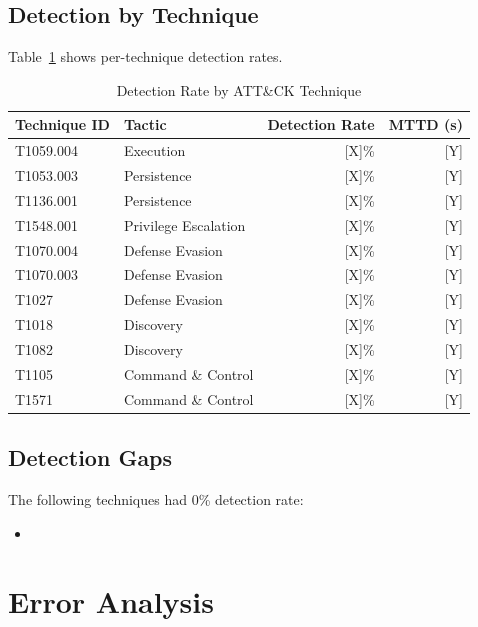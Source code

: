 \documentclass[11pt,a4paper]{article}
\begin{document}
\subsection{Detection by Technique}

Table~\ref{tab:results} shows per-technique detection rates.

\begin{table}[H]
    \centering
    \caption{Detection Rate by ATT\&CK Technique}
    \label{tab:results}
    \begin{tabular}{llrr}
        \toprule
        \textbf{Technique ID} & \textbf{Tactic} & \textbf{Detection Rate} & \textbf{MTTD (s)} \\
        \midrule
        T1059.004 & Execution & [X]\% & [Y] \\
        T1053.003 & Persistence & [X]\% & [Y] \\
        T1136.001 & Persistence & [X]\% & [Y] \\
        T1548.001 & Privilege Escalation & [X]\% & [Y] \\
        T1070.004 & Defense Evasion & [X]\% & [Y] \\
        T1070.003 & Defense Evasion & [X]\% & [Y] \\
        T1027 & Defense Evasion & [X]\% & [Y] \\
        T1018 & Discovery & [X]\% & [Y] \\
        T1082 & Discovery & [X]\% & [Y] \\
        T1105 & Command \& Control & [X]\% & [Y] \\
        T1571 & Command \& Control & [X]\% & [Y] \\
        \bottomrule
    \end{tabular}
\end{table}

\subsection{Detection Gaps}

The following techniques had 0\% detection rate:

\begin{itemize}
    \item [List techniques with detection failures]
\end{itemize}

\section{Error Analysis}
\end{document}
